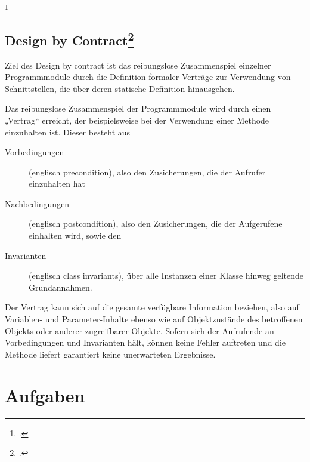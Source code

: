 \documentclass{lehramt-informatik-haupt}
\begin{document}
\footcite[Seite 44]{sosy:fs:5}

%

\section{Design by Contract\footcite{wiki:design-by-contract}}

Ziel des Design by contract ist das reibungslose Zusammenspiel einzelner
Programmmodule durch die Definition formaler Verträge zur Verwendung von
Schnittstellen, die über deren statische Definition hinausgehen.

Das reibungslose Zusammenspiel der Programmmodule wird durch einen
„Vertrag“ erreicht, der beispielsweise bei der Verwendung einer Methode
einzuhalten ist. Dieser besteht aus

\begin{description}
\item[Vorbedingungen] (englisch precondition), also den Zusicherungen,
die der Aufrufer einzuhalten hat

\item[Nachbedingungen] (englisch postcondition), also den Zusicherungen,
die der Aufgerufene einhalten wird, sowie den

\item[Invarianten] (englisch class invariants), über alle Instanzen
einer Klasse hinweg geltende Grundannahmen.
\end{description}

Der Vertrag kann sich auf die gesamte verfügbare Information beziehen,
also auf Variablen- und Parameter-Inhalte ebenso wie auf Objektzustände
des betroffenen Objekts oder anderer zugreifbarer Objekte. Sofern sich
der Aufrufende an Vorbedingungen und Invarianten hält, können keine
Fehler auftreten und die Methode liefert garantiert keine unerwarteten
Ergebnisse.


\chapter{Aufgaben}

%
\end{document}
